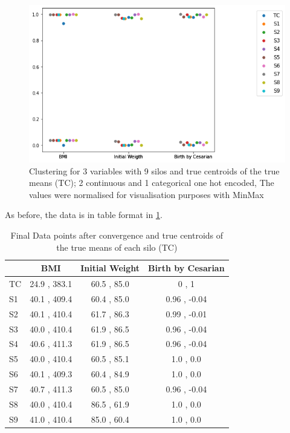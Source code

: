 


\begin{figure}[H]
\centering
\captionsetup{justification=centering}
\caption[Clustering for 3 variables with 9 silos]{Clustering for 3 variables with 9 silos and true centroids of the true means (TC); 2 continuous and 1 categorical one hot encoded, The values were normalised for visualisation purposes with MinMax}\label{fig:cluster_mydata_9s} 
\includegraphics[scale=0.60]{figures/my_cluster_9.png}
\end{figure}

As before, the data is in table format in \ref{tab:datapoints_9}.


\begin{table}[htbp]
\centering
 \setlength{\tabcolsep}{7pt} %
 \renewcommand{\arraystretch}{1.35} %
  \captionsetup{justification=centering} 
\caption{Final Data points after convergence and true centroids of the true means of each silo (TC)}
\label{tab:datapoints_9}
\begin{tabular}{l|ccc}
\toprule
 & BMI & Initial Weight & Birth by Cesarian \\
\midrule
TC & 24.9 , 383.1 & 60.5 , 85.0  & 0 , 1 \\
S1 & 40.1 , 409.4 & 60.4 , 85.0 & 0.96 , -0.04 \\
S2 & 40.1 , 410.4 & 61.7 , 86.3 & 0.99 , -0.01 \\
S3 & 40.0 , 410.4 & 61.9 , 86.5 & 0.96 , -0.04 \\
S4 & 40.6 , 411.3 & 61.9 , 86.5 & 0.96 , -0.04 \\
S5 & 40.0 , 410.4 & 60.5 , 85.1 & 1.0 , 0.0 \\
S6 & 40.1 , 409.3 & 60.4 , 84.9 & 1.0 , 0.0 \\
S7 & 40.7 , 411.3 & 60.5 , 85.0 & 0.96 , -0.04 \\
S8 & 40.0 , 410.4 & 86.5 , 61.9 & 1.0 , 0.0 \\
S9 & 41.0 , 410.4 & 85.0 , 60.4 & 1.0 , 0.0 \\
\bottomrule
\end{tabular}
\end{table}




